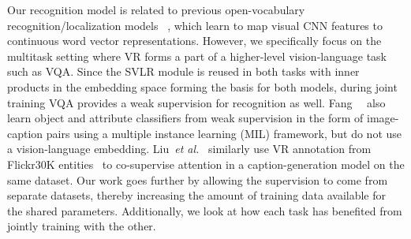 Our recognition model is related to previous open-vocabulary recognition/localization models ~\cite{wang2016learning,rohrbach2016grounding,gong2014improving}, which learn to map visual CNN features to continuous word vector representations. However, we specifically focus on the multitask setting where VR forms a part of a higher-level vision-language task such as VQA. Since the SVLR module is reused in both tasks with inner products in the embedding space forming the basis for both models, during joint training VQA provides a weak supervision for recognition as well. Fang~\etal~\cite{fang2015cvpr} also learn object and attribute classifiers from weak supervision in the form of image-caption pairs using a multiple instance learning (MIL) framework, but do not use a vision-language embedding. Liu~\emph{et al.}~\cite{liu2016attention} similarly use VR annotation from Flickr30K entities~\cite{plummer2015flickr30k} to co-supervise attention in a caption-generation model on the same dataset. Our work goes further by allowing the supervision to come from separate datasets, thereby increasing the amount of training data available for the shared parameters. Additionally, we look at how each task has benefited from jointly training with the other.\\
\vspace{-2mm}




